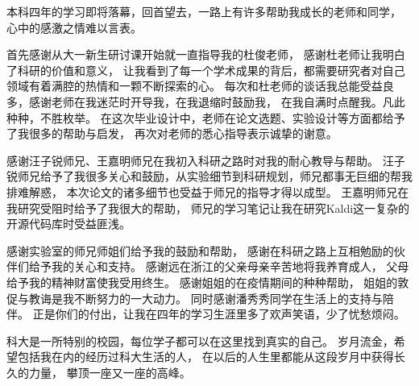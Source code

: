 
\begin{acknowledgements}
	
	本科四年的学习即将落幕，回首望去，一路上有许多帮助我成长的老师和同学，
	心中的感激之情难以言表。
	
	首先感谢从大一新生研讨课开始就一直指导我的杜俊老师，
	感谢杜老师让我明白了科研的价值和意义，
	让我看到了每一个学术成果的背后，都需要研究者对自己领域有着满腔的热情和一颗不断探索的心。
	每次和杜老师的谈话我总能受益良多，感谢老师在我迷茫时开导我，在我退缩时鼓励我，
	在我自满时点醒我。凡此种种，不胜枚举。
	在这次毕业设计中，老师在论文选题、实验设计等方面都给予了我很多的帮助与启发，
	再次对老师的悉心指导表示诚挚的谢意。
	
	感谢汪子锐师兄、王嘉明师兄在我初入科研之路时对我的耐心教导与帮助。
	汪子锐师兄给予了我很多关心和鼓励，从实验细节到科研规划，师兄都事无巨细的帮我排难解惑，
	本次论文的诸多细节也受益于师兄的指导才得以成型。
	王嘉明师兄在我研究受阻时给予了我很大的帮助，
	师兄的学习笔记让我在研究Kaldi这一复杂的开源代码库时受益匪浅。
	
	感谢实验室的师兄师姐们给予我的鼓励和帮助，
	感谢在科研之路上互相勉励的伙伴们给予我的关心和支持。
	感谢远在浙江的父亲母亲辛苦地将我养育成人，
	父母给予我的精神财富使我受用终生。
	感谢姐姐的在疫情期间的种种帮助，
	姐姐的敦促与教诲是我不断努力的一大动力。
	同时感谢潘秀秀同学在生活上的支持与陪伴。
	正是你们的付出，让我在四年的学习生涯里多了欢声笑语，少了忧愁烦闷。
	
	科大是一所特别的校园，每位学子都可以在这里找到真实的自己。
	岁月流金，希望包括我在内的经历过科大生活的人，
	在以后的人生里都能从这段岁月中获得长久的力量，
	攀顶一座又一座的高峰。
	
\end{acknowledgements}
